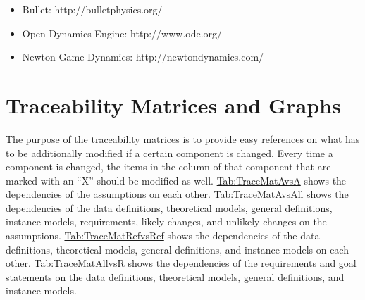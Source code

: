 \documentclass[12pt]{article}
\begin{document}
\begin{itemize}
\item{Bullet: http://bulletphysics.org/}
\item{Open Dynamics Engine: http://www.ode.org/}
\item{Newton Game Dynamics: http://newtondynamics.com/}
\end{itemize}
\section{Traceability Matrices and Graphs}
\label{Sec:TraceMatrices}
The purpose of the traceability matrices is to provide easy references on what has to be additionally modified if a certain component is changed. Every time a component is changed, the items in the column of that component that are marked with an ``X'' should be modified as well. \hyperref[Table:TraceMatAvsA]{Tab:TraceMatAvsA} shows the dependencies of the assumptions on each other. \hyperref[Table:TraceMatAvsAll]{Tab:TraceMatAvsAll} shows the dependencies of the data definitions, theoretical models, general definitions, instance models, requirements, likely changes, and unlikely changes on the assumptions. \hyperref[Table:TraceMatRefvsRef]{Tab:TraceMatRefvsRef} shows the dependencies of the data definitions, theoretical models, general definitions, and instance models on each other. \hyperref[Table:TraceMatAllvsR]{Tab:TraceMatAllvsR} shows the dependencies of the requirements and goal statements on the data definitions, theoretical models, general definitions, and instance models.
\end{document}

